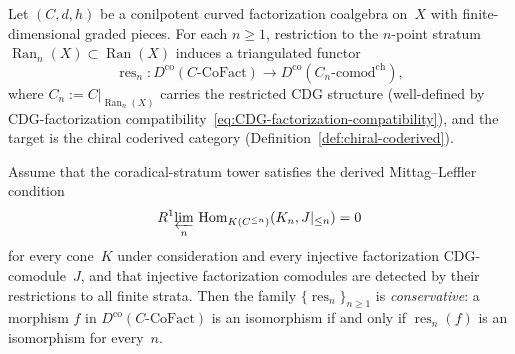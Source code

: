 \begin{theorem}
\label{thm:stratified-conservative-restriction}
Let $(C, d, h)$ be a conilpotent curved factorization coalgebra
on~$X$ with finite-dimensional graded pieces.
For each $n \geq 1$, restriction to the $n$-point stratum
$\operatorname{Ran}_n(X) \subset \operatorname{Ran}(X)$ induces a
triangulated functor
\[
\operatorname{res}_n \colon
D^{\mathrm{co}}(C\text{-}\mathrm{CoFact})
\longrightarrow
D^{\mathrm{co}}(C_n\text{-}\mathrm{comod}^{\mathrm{ch}}),
\]
where $C_n := C|_{\operatorname{Ran}_n(X)}$ carries the restricted
CDG structure \textup{(}well-defined by CDG-factorization
compatibility~\eqref{eq:CDG-factorization-compatibility}\textup{)},
and the target is the chiral coderived category
\textup{(}Definition~\textup{\ref{def:chiral-coderived})}.

Assume that the coradical-stratum tower satisfies the derived
Mittag--Leffler condition
\[
R^1\!\varprojlim_n\,
\mathrm{Hom}_{K(C^{\leq n})}(K_n,J|_{\leq n})=0
\]
for every cone~$K$ under consideration and every injective
factorization CDG-comodule~$J$, and that injective factorization
comodules are detected by their restrictions to all finite strata.
Then the family $\{\operatorname{res}_n\}_{n \geq 1}$ is
\emph{conservative}: a morphism $f$ in
$D^{\mathrm{co}}(C\text{-}\mathrm{CoFact})$ is an isomorphism if
and only if $\operatorname{res}_n(f)$ is an isomorphism for
every~$n$.
\end{theorem}

